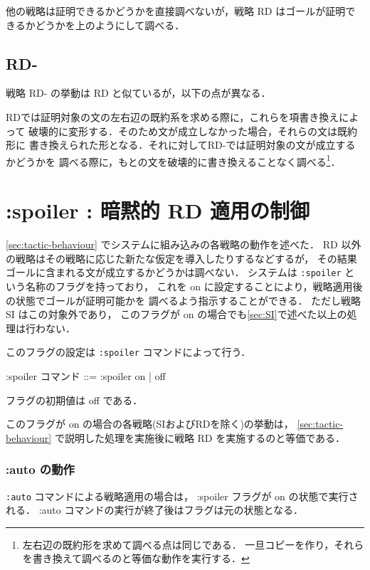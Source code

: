 \documentclass[a4paper,oneside,10pt,here]{memoir}
\newenvironment{vvtm}%
{\parskip=0pt\lineskip=0pt\begin{center}\begin{minipage}{0.8\textwidth}\begin{snugshade}}%
  {\end{snugshade}\end{minipage}\end{center}}
\begin{document}
他の戦略は証明できるかどうかを直接調べないが，戦略 RD はゴールが証明できるかどうかを上のようにして調べる．

\subsection{RD-} \label{sec:rd-}
戦略 RD- の挙動は RD と似ているが，以下の点が異なる．

RDでは証明対象の文の左右辺の既約系を求める際に，これらを項書き換えによって
破壊的に変形する．そのため文が成立しなかった場合，それらの文は既約形に
書き換えられた形となる．それに対してRD-では証明対象の文が成立するかどうかを
調べる際に，もとの文を破壊的に書き換えることなく調べる\footnote{左右辺の既約形を求めて調べる点は同じである．
一旦コピーを作り，それらを書き換えて調べるのと等価な動作を実行する．}．

\section{:spoiler : 暗黙的 RD 適用の制御} \label{sec:spoiler-flag}

\ref{sec:tactic-behaviour} でシステムに組み込みの各戦略の動作を述べた．
RD 以外の戦略はその戦略に応じた新たな仮定を導入したりするなどするが，
その結果ゴールに含まれる文が成立するかどうかは調べない．
システムは \verb|:spoiler| という名称のフラグを持っており，
これを on に設定することにより，戦略適用後の状態でゴールが証明可能かを%
調べるよう指示することができる．
ただし戦略 SI はこの対象外であり，
このフラグが on の場合でも\ref{sec:SI}で述べた以上の処理は行わない．

このフラグの設定は \verb|:spoiler| コマンドによって行う．
  \begin{vvtm}
    \begin{simplev}
  :spoiler コマンド ::= :spoiler { on | off }
    \end{simplev}
  \end{vvtm}

フラグの初期値は off である．

このフラグが on の場合の各戦略(SIおよびRDを除く)の挙動は，%
\ref{sec:tactic-behaviour} で説明した処理を実施後に戦略 RD を実施するのと等価である．

\subsubsection{:auto の動作}\label{sec:auto-and-spoiler}
\texttt{:auto} コマンドによる戦略適用の場合は，
:spoiler フラグが on の状態で実行される．
:auto コマンドの実行が終了後はフラグは元の状態となる．
\end{document}
